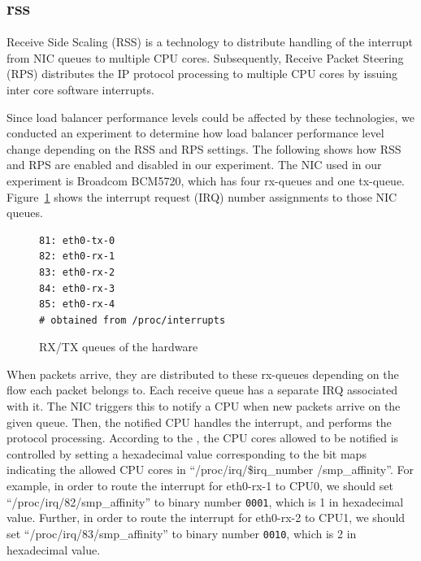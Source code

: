 \subsection{rss}

Receive Side Scaling (RSS)\cite{TomHerbert} is a technology 
to distribute handling of the interrupt from NIC queues to multiple CPU cores.
Subsequently, Receive Packet Steering (RPS)\cite{TomHerbert} distributes the IP protocol processing 
to multiple CPU cores by issuing inter core software interrupts.

Since load balancer performance levels could be affected by these technologies,
we conducted an experiment to determine how load balancer performance level change depending on the RSS and RPS settings.
The following shows how RSS and RPS are enabled and disabled in our experiment. 
The NIC used in our experiment is Broadcom BCM5720, which has four rx-queues and one tx-queue.
Figure~\ref{fig:rx-queue} shows the interrupt request (IRQ) number assignments to those NIC queues.

\begin{figure}
\centering
\begin{minipage}{0.5\columnwidth}
\begin{verbatim}
81: eth0-tx-0
82: eth0-rx-1
83: eth0-rx-2
84: eth0-rx-3
85: eth0-rx-4
# obtained from /proc/interrupts 
\end{verbatim}
\end{minipage}
\caption{RX/TX queues of the hardware}
\label{fig:rx-queue}
\end{figure}

When packets arrive, they are distributed to these rx-queues depending on the flow each packet belongs to.
Each receive queue has a separate IRQ associated with it. The NIC triggers
this to notify a CPU when new packets arrive on the given queue.
Then, the notified CPU handles the interrupt, and performs the protocol processing. 
According to the \cite{TomHerbert}, the CPU cores allowed to be notified is controlled by setting 
a hexadecimal value corresponding to the bit maps indicating the allowed CPU cores in \enquote{/proc/irq/\$irq\_number /smp\_affinity}.
%
For example, in order to route the interrupt for eth0-rx-1 to CPU0, 
we should set \enquote{/proc/irq/82/smp\_affinity} 
to binary number {\tt 0001}, which is 1 in hexadecimal value.
Further, in order to route the interrupt for eth0-rx-2 to CPU1, we 
should set \enquote{/proc/irq/83/smp\_affinity} 
to binary number {\tt 0010}, which is 2 in hexadecimal value.

